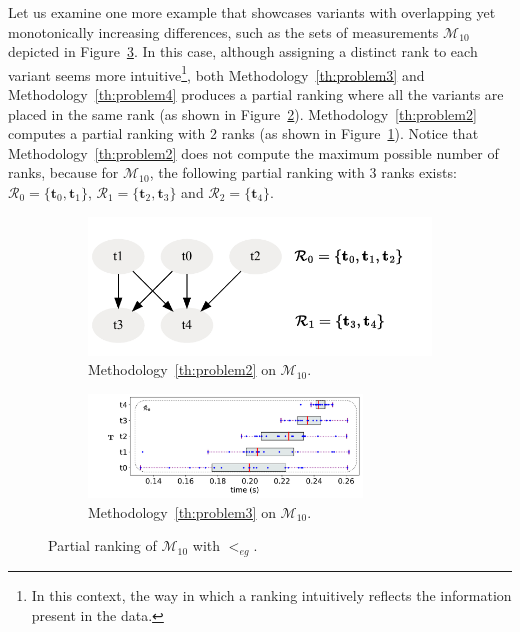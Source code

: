 \documentclass[acmsmall,screen, review]{acmart}
\begin{document}
Let us examine one more example that showcases variants with overlapping yet monotonically increasing differences, such as the sets of measurements $\mathcal{M}_{10}$ depicted in Figure~\ref{fig3:minrank-eg5}. In this case, although assigning a distinct rank to each variant seems more intuitive\footnote{In this context, the way in which a ranking intuitively reflects the information present in the data.}, both Methodology~\ref{th:problem3} and Methodology~\ref{th:problem4} produces a partial ranking where all the variants are placed in the same rank (as shown in Figure~\ref{fig3:minrank-eg5-r}). Methodology~\ref{th:problem2} computes a partial ranking with 2 ranks (as shown in Figure~\ref{fig3:minrank-eg5-dfg}). Notice that Methodology~\ref{th:problem2} does not compute the maximum possible number of ranks, because for $\mathcal{M}_{10}$, the following partial ranking with 3 ranks exists: $\mathcal{R}_0 = \{\mathbf{t}_0, \mathbf{t}_1\}$,  $\mathcal{R}_1 = \{\mathbf{t}_2, \mathbf{t}_3\}$ and  $\mathcal{R}_2 = \{\mathbf{t}_4\}$.

\begin{figure}[h!]
	\centering
	\begin{subfigure}{0.45\textwidth}
		\centering
		\includegraphics[width=\textwidth]{fig/ch3/minrank-eg5-dfg}
		\caption{Methodology~\ref{th:problem2} on $\mathcal{M}_{10}$.}
		\label{fig3:minrank-eg5-dfg}
	\end{subfigure}
	\hfill
	\begin{subfigure}{0.85\textwidth}
		\centering
		\includegraphics[width=0.8\textwidth]{fig/ch3/minrank-eg5-r}
		\caption{Methodology~\ref{th:problem3} on $\mathcal{M}_{10}$.}
		\label{fig3:minrank-eg5-r}
	\end{subfigure}
	\caption{Partial ranking of $\mathcal{M}_{10}$ with $<_{eg}$.  }
	\label{fig3:minrank-eg5}
\end{figure}
\end{document}
